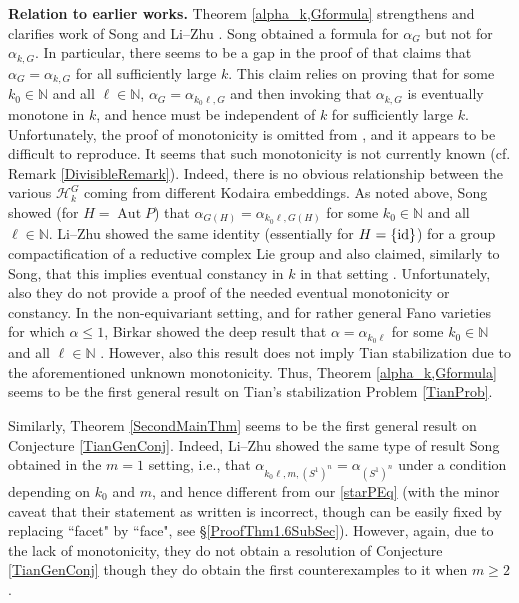 \documentclass{article}
\newcommand{\id}{{\rm id}}
\newcommand{\NN}{{\mathbb N}}
\renewcommand{\>}{\rightarrow}
\DeclareMathOperator{\Aut}{Aut}
\theoremstyle{plain}
\theoremstyle{definition}
\begin{document}
 
\bigskip
\noindent
{\bf Relation to earlier works.}
Theorem \ref{alpha_k,Gformula} strengthens and clarifies work of Song \cite{Song}
and Li--Zhu \cite{LiZhu}.
Song obtained a formula for $\alpha_G$ 
but not for $\alpha_{k,G}$. 
In particular, 
there seems to be a gap
in the proof
of \cite[Theorem 1.2]{Song}
that claims that $\alpha_G=\alpha_{k,G}$
for all sufficiently large $k$.
This claim relies on proving  
that for some $k_0\in\NN$
and all $\ell\in\NN$, 
$\alpha_G=\alpha_{k_0\ell,G}$
and then invoking that $\alpha_{k,G}$ is eventually monotone in $k$, and
hence must be independent of $k$ for sufficiently large $k$.
Unfortunately, the proof of monotonicity
is omitted from \cite[p. 1257, line 7]{Song}, 
and it appears to be difficult to reproduce. 
It seems that such monotonicity is not currently known (cf.
Remark
\ref{DivisibleRemark}).
Indeed, there is no obvious
relationship between the various $\mathcal H^G_k$ coming from different
Kodaira embeddings.  
As noted above, Song showed (for $H=\Aut P$) that $\alpha_{G(H)}=
\alpha_{k_0\ell,G(H)}$ for  some $k_0\in\NN$ and all $\ell\in\NN$.
Li--Zhu showed the same identity (essentially for $H=\{\id\}$) for a group compactification of a reductive complex Lie group and also claimed,
similarly to Song, that this implies eventual constancy in $k$ in that setting
\cite[Theorem 1.3, p. 233]{LiZhu}. Unfortunately, also they do not provide
a proof of the needed eventual monotonicity or constancy.
In the non-equivariant
setting, and for rather general Fano varieties for which $\alpha\le1$,
Birkar showed the deep result that  $\alpha=\alpha_{k_0\ell}$ for  some $k_0\in\NN$ and all $\ell\in\NN$ \cite[Theorem 1.7]{Birkar2022}. 
However, also this result does not imply Tian stabilization due
to the aforementioned unknown monotonicity. 
Thus, Theorem \ref{alpha_k,Gformula} seems to be the first general result
on Tian's stabilization Problem \ref{TianProb}. 


Similarly, Theorem \ref{SecondMainThm} seems to be the first general result
on Conjecture \ref{TianGenConj}. 
Indeed, Li--Zhu showed the same type of result
Song obtained in the $m=1$ setting,
i.e., that $\alpha_{k_0\ell,m,(S^1)^n}=\alpha_{(S^1)^n}$ under a condition
depending on $k_0$ and $m$, and hence
different from our \eqref{starPEq} (with the minor caveat that their
statement as written \cite[Theorem 1.4]{LiZhu} is incorrect, 
though can be easily fixed by replacing ``facet" by ``face", see 
\S\ref{ProofThm1.6SubSec}).
However, again, due to the lack of monotonicity, they do not obtain
a resolution of Conjecture \ref{TianGenConj} though they do obtain 
the first counterexamples to it when $m\ge2$.
\end{document}
